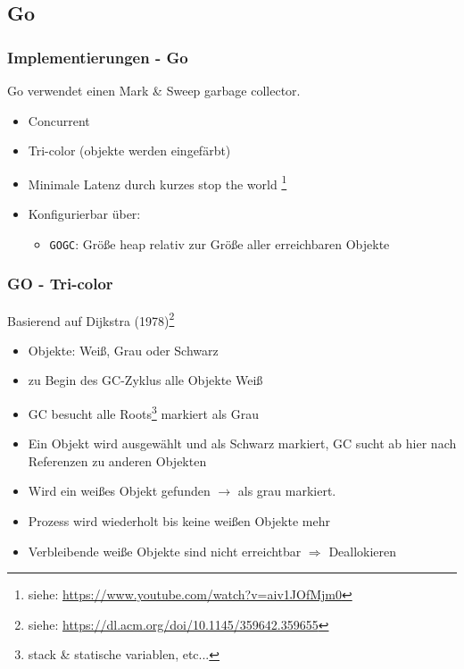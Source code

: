 \documentclass{beamer}
\begin{document}
        \subsection{Go}
            \begin{frame}
                \frametitle{Implementierungen - Go}

                Go verwendet einen Mark \& Sweep garbage collector.

            \begin{itemize}
                    \item Concurrent
                    \item Tri-color (objekte werden eingefärbt)
                    \item Minimale Latenz durch kurzes stop the world
                        \footnote{siehe:
                        \href{https://www.youtube.com/watch?v=aiv1JOfMjm0}{https://www.youtube.com/watch?v=aiv1JOfMjm0}}
                    \item Konfigurierbar über:
                        \begin{itemize}
                            \item \texttt{GOGC}: Größe heap relativ zur Größe aller erreichbaren Objekte
                        \end{itemize}
                \end{itemize}
            \end{frame}

            \begin{frame}
                \frametitle{GO - Tri-color}

                Basierend auf Dijkstra (1978)\footnote{siehe:
                \href{https://dl.acm.org/doi/10.1145/359642.359655}{https://dl.acm.org/doi/10.1145/359642.359655}} 

                \begin{itemize}
                    \item Objekte: Weiß, Grau oder Schwarz
                    \item zu Begin des GC-Zyklus alle Objekte Weiß
                    \item GC besucht alle Roots\footnote{stack \& statische variablen, etc...} markiert als Grau
                    \item Ein Objekt wird ausgewählt und als Schwarz markiert, GC sucht ab hier nach Referenzen zu anderen Objekten
                    \item Wird ein weißes Objekt gefunden $\rightarrow$ als grau markiert.
                    \item Prozess wird wiederholt bis keine weißen Objekte mehr 
                    \item Verbleibende weiße Objekte sind nicht erreichtbar $\Rightarrow$ Deallokieren 
                \end{itemize}
            \end{frame}
\end{document}
